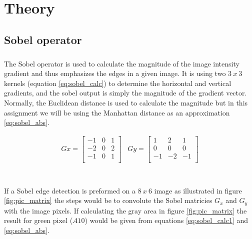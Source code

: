 \chapter{Theory}
\label{chap:theory}

\section{Sobel operator}
\label{sec:Sobel}
\paragraph*{}
The Sobel operator is used to calculate the magnitude of the image intensity gradient and thus emphasizes the edges in a given image. It is using two $3~x~3$ kernels (equation \ref{eq:sobel_calc}) to determine the horizontal and vertical gradients, and the sobel output is simply the magnitude of the gradient vector.
Normally, the Euclidean distance is used to calculate the magnitude but in this assignment we will be using the Manhattan distance as an approximation \ref{eq:sobel_abs}.

\begin{equation}
\begin{array}{cc}
Gx = \left[ 
\begin{array}{ccc}
	-1 & 0 & 1\\
    -2 & 0 & 2\\
    -1 & 0 & 1\\
\end{array} \right] &
Gy = \left[ 
\begin{array}{ccc}
	1 & 2 & 1\\
    0 & 0 & 0\\
    -1 & -2 & -1\\
\end{array}
\right]
\end{array}
\label{eq:sobel_calc}
\end{equation}\\

\paragraph*{}
If a Sobel edge detection is preformed on a $8~x~6$ image as illustrated in figure \ref{fig:pic_matrix} the steps would be to convolute the Sobel matricies $G_x$ and $G_y$ with the image pixels. If calculating the gray area in figure \ref{fig:pic_matrix} the result for green pixel ($A10$) would be given from equations \ref{eq:sobel_calc1} and \ref{eq:sobel_abs}.  

